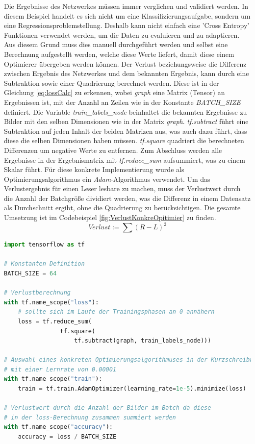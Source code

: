 Die Ergebnisse des Netzwerkes müssen immer verglichen und validiert werden. 
In diesem Beispiel handelt es sich nicht um eine Klassifizierungsaufgabe, sondern um eine Regressionsproblemstellung. 
Deshalb kann nicht einfach eine 'Cross Entropy' Funktionen verwendet werden, um die Daten zu evaluieren und zu adaptieren. 
Aus diesem Grund muss dies manuell durchgeführt werden und selbst eine Berechnung aufgestellt werden, welche diese Werte liefert, damit diese einem Optimierer übergeben werden können. 
Der Verlust beziehungsweise die Differenz zwischen Ergebnis des Netzwerkes und dem bekannten Ergebnis, kann durch eine Subtraktion sowie einer Quadrierung berechnet werden. 
Diese ist in der Gleichung \ref{eq:lossCalc} zu erkennen, wobei \textit{graph} eine Matrix (Tensor) an Ergebnissen ist, mit der Anzahl an Zeilen wie in der Konstante \textit{BATCH\_SIZE} definiert. 
Die Variable \textit{train\_labels\_node} beinhaltet die bekannten Ergebnisse zu Bilder mit den selben Dimensionen wie in der Matrix \textit{graph}. 
\textit{tf.subtract} führt eine Subtraktion auf jeden Inhalt der beiden Matrizen aus, was auch dazu führt, dass diese die selben Dimensionen haben müssen. 
\textit{tf.square} quadriert die berechneten Differenzen um negative Werte zu entfernen. 
Zum Abschluss werden alle Ergebnisse in der Ergebnismatrix mit \textit{tf.reduce\_sum} aufsummiert, was zu einem Skalar führt. 
Für diese konkrete Implementierung wurde als Optimierungsalgorithmus ein \textit{Adam}-Algorithmus \cite{DBLP:journals/corr/KingmaB14} verwendet. 
Um das Verlustergebnis für einen Leser lesbare zu machen, muss der Verlustwert durch die Anzahl der Batchgröße dividiert werden, was die Differenz in einem Datensatz als Durchschnitt ergibt, ohne die Quadrierung zu berücksichtigen. 
Die gesamte Umsetzung ist im Codebeispiel \ref{fig:VerlustKonkreOpitimier} zu finden. 
\begin{equation}
	Verlust := \sum{(R - L)^2}
	\label{eq:lossCalc}
\end{equation}
\begin{lstlisting}[caption={Verlustberechnung, konkreter Opitimierungsalgorithmus, Genauigkeitsberechnung},label=fig:VerlustKonkreOpitimier,captionpos=b,language=Python]
import tensorflow as tf

# Konstanten Definition
BATCH_SIZE = 64

# Verlustberechnung
with tf.name_scope("loss"):
    # sollte sich im Laufe der Trainingsphasen an 0 annähern
    loss = tf.reduce_sum(
    			tf.square(
    				tf.subtract(graph, train_labels_node)))

# Auswahl eines konkreten Optimierungsalgorithmuses in der Kurzschreibweise
# mit einer Lernrate von 0.00001
with tf.name_scope("train"):
    train = tf.train.AdamOptimizer(learning_rate=1e-5).minimize(loss)
    
# Verlustwert durch die Anzahl der Bilder im Batch da diese 
# in der loss-Berechnung zusammen summiert werden
with tf.name_scope("accuracy"):    
    accuracy = loss / BATCH_SIZE
\end{lstlisting}
 
